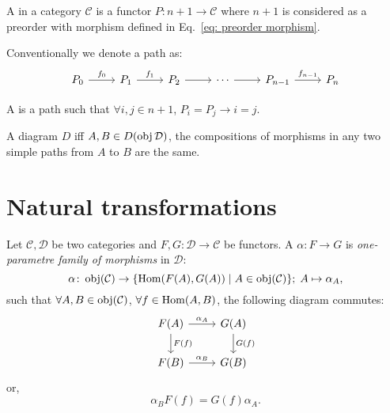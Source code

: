 \documentclass[openany, a5paper]{book}
\begin{document}
\begin{definition}[Path]
	A  in a category $\mathcal C$ is a functor $P \colon n + 1 \to \mathcal C$ where $n + 1$ is considered as a preorder with morphism defined in Eq.~\eqref{eq: preorder morphism}.  
\end{definition}

Conventionally we denote a path as:
\begin{equation}
\begin{tikzcd}
	P_0 \arrow[r, "f_0"] & P_1 \arrow[r, "f_1"] & P_2 \arrow[r] & \cdots \arrow[r] & P_{n-1} \arrow[r, "f_{n-1}"] & P_n
	\end{tikzcd}
\end{equation}

A  is a path such that $\forall i, j \in n + 1$, $P_i = P_j \to i = j$.

A diagram $D$  iff $A, B \in D(\operatorname{obj} \mathcal D)$, the compositions of morphisms in any two simple paths from $A$ to $B$ are the same.

\section{Natural transformations}
\begin{definition}
	Let $\mathcal C, \mathcal D$ be two categories and $F, G \colon \mathcal D \to \mathcal C$ be functors.
	A  $\alpha \colon F \to G$ is \emph{one-parametre family of morphisms} in $\mathcal D$:
	\begin{equation}
		\alpha \colon \operatorname{obj}(\mathcal C) \to \{\operatorname{Hom}(F(A), G(A))\mid A \in \operatorname{obj} (\mathcal C)\};
		\;
		A \mapsto \alpha_A,
	\end{equation}
	such that $\forall A, B \in \operatorname{obj}(\mathcal C)$, $\forall f \in \operatorname{Hom}(A, B)$, the following diagram commutes:
	\begin{equation}
		\begin{tikzcd}
			F(A) \arrow[d, "F(f)"] \arrow[r, "\alpha_A"] & G(A) \arrow[d, "G(f)"] \\
			F(B) \arrow[r, "\alpha_B"]                   & G(B)                  
		\end{tikzcd}
	\end{equation}
	or,
	\begin{equation}
		\alpha_B  F(f) = G(f) \alpha_A.
	\end{equation}
\end{definition}
\end{document}
